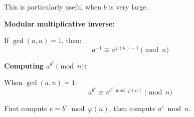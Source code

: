 This is particularly useful when $b$ is very large.

\textbf{Modular multiplicative inverse:}

If $\gcd(a,n) = 1$, then:
\begin{equation}
    a^{-1} \equiv a^{\varphi(n)-1} \pmod{n}
\end{equation}

\textbf{Computing $a^{b^c} \pmod{n}$:}

When $\gcd(a,n) = 1$:
\begin{equation}
    a^{b^c} \equiv a^{b^c \bmod \varphi(n)} \pmod{n}
\end{equation}

First compute $e = b^c \bmod \varphi(n)$, then compute $a^e \bmod n$.
